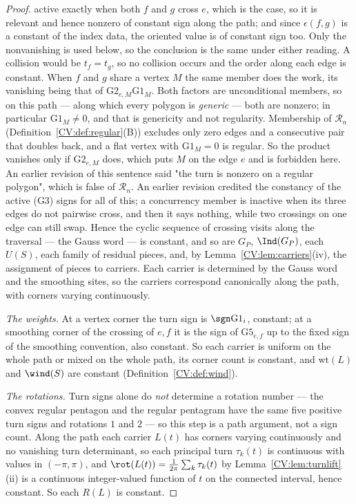 \begin{proof}
active exactly when both $f$ and $g$ cross $e$, which is the case, so it is
relevant and hence nonzero of constant sign along the path; and since
$\epsilon(f,g)$ is a constant of the index data, the oriented value is of
constant sign too. Only the nonvanishing is used below, so the conclusion is
the same under either reading. A collision would be $t_f=t_g$, so no collision occurs and the
order along each edge is constant. When $f$ and $g$ share a vertex $M$ the same
member does the work, its vanishing being that of
$\mathrm{G2}_{e,M}\mathrm{G1}_M$. Both factors are unconditional members, so on
this path --- along which every polygon is \emph{generic} --- both are nonzero;
in particular $\mathrm{G1}_M\neq0$, and that is genericity and not regularity.
Membership of $\mathcal R_n$ (Definition~\ref{CV:def:regular}(B)) excludes only zero
edges and a consecutive pair that doubles back, and a flat vertex with
$\mathrm{G1}_M=0$ is regular. So the product vanishes only if
$\mathrm{G2}_{e,M}$ does, which puts $M$ on the edge $e$ and is forbidden here.
An earlier revision of this sentence said "the turn is nonzero on a regular
polygon", which is false of $\mathcal R_n$. An earlier revision credited
the constancy of the active (G3) signs for all of this; a concurrency member is
inactive when its three edges do not pairwise cross, and then it says nothing,
while two crossings on one edge can still swap. Hence the cyclic sequence of crossing visits along
the traversal --- the Gauss word --- is constant, and so are $G_P$, $\Ind(G_P)$,
each $U(S)$, each family of residual pieces, and, by
Lemma~\ref{CV:lem:carriers}(iv), the assignment of pieces to carriers. Each
carrier is determined by the Gauss word and the smoothing sites, so the carriers
correspond canonically along the path, with corners varying continuously.

\emph{The weights.} At a vertex corner the turn sign is $\sgn\mathrm{G1}_i$,
constant; at a smoothing corner of the crossing of $e,f$ it is the sign of
$\mathrm{G5}_{e,f}$ up to the fixed sign of the smoothing convention, also
constant. So each carrier is uniform on the whole path or mixed on the whole
path, its corner count is constant, and $\mathrm{wt}(L)$ and $\wind(S)$ are
constant (Definition~\ref{CV:def:wind}).

\emph{The rotations.} Turn signs alone do \emph{not} determine a rotation
number --- the convex regular pentagon and the regular pentagram have the same
five positive turn signs and rotations $1$ and $2$ --- so this step is a path
argument, not a sign count. Along the path each carrier $L(t)$ has corners
varying continuously and no vanishing turn determinant, so each principal turn
$\tau_k(t)$ is continuous with values in $(-\pi,\pi)$, and
$\rot(L(t))=\frac1{2\pi}\sum_k\tau_k(t)$ by Lemma~\ref{CV:lem:turnlift}(ii) is a
continuous integer-valued function of $t$ on the connected interval, hence
constant. So each $R(L)$ is constant.


\end{proof}

